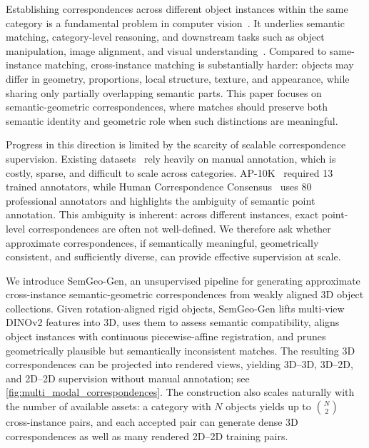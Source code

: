 Establishing correspondences across different object instances within the same category is a fundamental problem in computer vision~\cite{min2019spair71k,WahCUB_200_2011,yu2021AP10k,omninocs2024,zhang2023taleTwoFeatures,zhang2024tellingLeftFromRight,shi2021skeletonmerger,you2022ukpgan,ju2025robo_abc}. It underlies semantic matching, category-level reasoning, and downstream tasks such as object manipulation, image alignment, and visual understanding~\cite{zhang2023taleTwoFeatures,zhang2024tellingLeftFromRight,mariotti2024sphericalmap,Amoyal:CVPR:2026:GSA,Hirsch:NeurIPS:2025:FastJAM,Barel:ECCV:2024:SpaceJAM,wang2019visualcorrespondencerobotics,zhu2025densematcher,you2020,luo2023DiffusionHyperFeaturesTimeSpace,hedlin2023unsupervisedstablediffusion}. Compared to same-instance matching, cross-instance matching is substantially harder: objects may differ in geometry, proportions, local structure, texture, and appearance, while sharing only partially overlapping semantic parts. This paper focuses on semantic-geometric correspondences, where matches should preserve both semantic identity and geometric role when such distinctions are meaningful.

Progress in this direction is limited by the scarcity of scalable correspondence supervision. Existing datasets~\cite{min2019spair71k,cuttano2026marco,yu2021AP10k,zhu2025densematcher,WahCUB_200_2011,omninocs2024,you2020,lou2020humanCorrespondenceConsensus,pratikakis2016shrec_16,zuffi2017menagerie,groueix2018b3dcodeddataset,dyke2019shrec_19} rely heavily on manual annotation, which is costly, sparse, and difficult to scale across categories. AP-10K~\cite{yu2021AP10k} required 13 trained annotators, while Human Correspondence Consensus~\cite{lou2020humanCorrespondenceConsensus} uses 80 professional annotators and highlights the ambiguity of semantic point annotation. This ambiguity is inherent: across different instances, exact point-level correspondences are often not well-defined. We therefore ask whether approximate correspondences, if semantically meaningful, geometrically consistent, and sufficiently diverse, can provide effective supervision at scale.

We introduce SemGeo-Gen, an unsupervised pipeline for generating approximate cross-instance semantic-geometric correspondences from weakly aligned 3D object collections. Given rotation-aligned rigid objects, SemGeo-Gen lifts multi-view DINOv2 features into 3D, uses them to assess semantic compatibility, aligns object instances with continuous piecewise-affine registration, and prunes geometrically plausible but semantically inconsistent matches. The resulting 3D correspondences can be projected into rendered views, yielding 3D--3D, 3D--2D, and 2D--2D supervision without manual annotation; see \autoref{fig:multi_modal_correspondences}. The construction also scales naturally with the number of available assets: a category with \(N\) objects yields up to \(\binom{N}{2}\) cross-instance pairs, and each accepted pair can generate dense 3D correspondences as well as many rendered 2D--2D training pairs.

